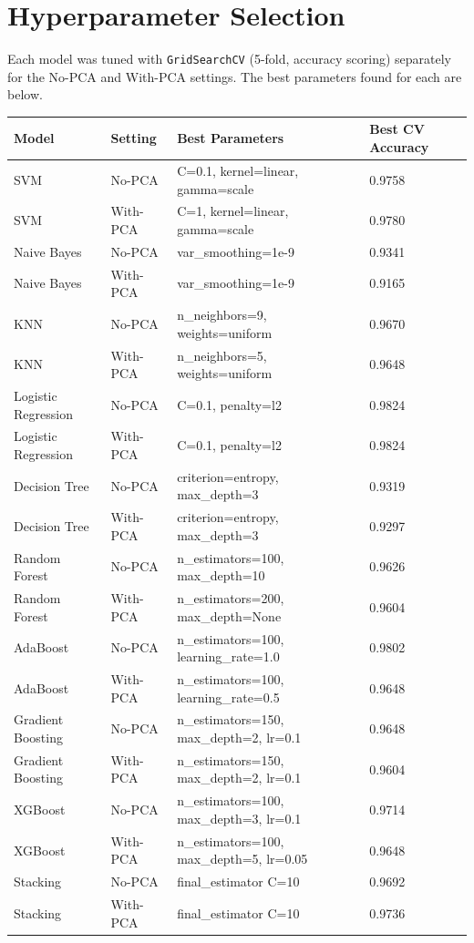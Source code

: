 \documentclass[12pt,a4paper]{article}
\begin{document}
\section{Hyperparameter Selection}
Each model was tuned with \texttt{GridSearchCV} (5-fold, accuracy scoring) separately for the
No-PCA and With-PCA settings. The best parameters found for each are below.

\begin{longtable}{p{3.2cm}p{2cm}p{5.5cm}p{2cm}}
\toprule
Model & Setting & Best Parameters & Best CV Accuracy \\
\midrule
SVM & No-PCA & C=0.1, kernel=linear, gamma=scale & 0.9758 \\
SVM & With-PCA & C=1, kernel=linear, gamma=scale & 0.9780 \\
Naive Bayes & No-PCA & var\_smoothing=1e-9 & 0.9341 \\
Naive Bayes & With-PCA & var\_smoothing=1e-9 & 0.9165 \\
KNN & No-PCA & n\_neighbors=9, weights=uniform & 0.9670 \\
KNN & With-PCA & n\_neighbors=5, weights=uniform & 0.9648 \\
Logistic Regression & No-PCA & C=0.1, penalty=l2 & 0.9824 \\
Logistic Regression & With-PCA & C=0.1, penalty=l2 & 0.9824 \\
Decision Tree & No-PCA & criterion=entropy, max\_depth=3 & 0.9319 \\
Decision Tree & With-PCA & criterion=entropy, max\_depth=3 & 0.9297 \\
Random Forest & No-PCA & n\_estimators=100, max\_depth=10 & 0.9626 \\
Random Forest & With-PCA & n\_estimators=200, max\_depth=None & 0.9604 \\
AdaBoost & No-PCA & n\_estimators=100, learning\_rate=1.0 & 0.9802 \\
AdaBoost & With-PCA & n\_estimators=100, learning\_rate=0.5 & 0.9648 \\
Gradient Boosting & No-PCA & n\_estimators=150, max\_depth=2, lr=0.1 & 0.9648 \\
Gradient Boosting & With-PCA & n\_estimators=150, max\_depth=2, lr=0.1 & 0.9604 \\
XGBoost & No-PCA & n\_estimators=100, max\_depth=3, lr=0.1 & 0.9714 \\
XGBoost & With-PCA & n\_estimators=100, max\_depth=5, lr=0.05 & 0.9648 \\
Stacking & No-PCA & final\_estimator C=10 & 0.9692 \\
Stacking & With-PCA & final\_estimator C=10 & 0.9736 \\
\bottomrule
\end{longtable}
\end{document}
